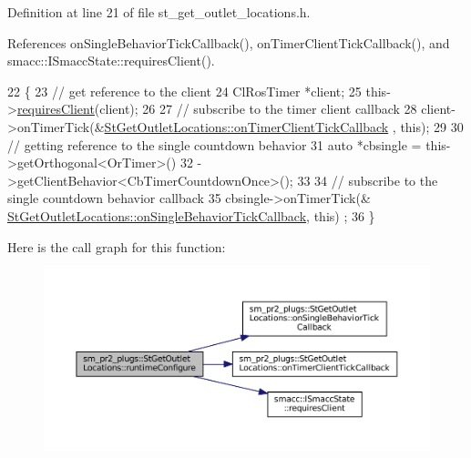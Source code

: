 Definition at line 21 of file st\+\_\+get\+\_\+outlet\+\_\+locations.\+h.



References on\+Single\+Behavior\+Tick\+Callback(), on\+Timer\+Client\+Tick\+Callback(), and smacc\+::\+I\+Smacc\+State\+::requires\+Client().


\begin{DoxyCode}
22     \{
23         \textcolor{comment}{// get reference to the client}
24         ClRosTimer *client;
25         this->\hyperlink{classsmacc_1_1ISmaccState_a7f95c9f0a6ea2d6f18d1aec0519de4ac}{requiresClient}(client);
26 
27         \textcolor{comment}{// subscribe to the timer client callback}
28         client->onTimerTick(&\hyperlink{structsm__pr2__plugs_1_1StGetOutletLocations_a46a5f83dd8f5465356ab0652f34c9c52}{StGetOutletLocations::onTimerClientTickCallback}
      , \textcolor{keyword}{this});
29 
30         \textcolor{comment}{// getting reference to the single countdown behavior}
31         \textcolor{keyword}{auto} *cbsingle = this->getOrthogonal<OrTimer>()
32                              ->getClientBehavior<CbTimerCountdownOnce>();
33 
34         \textcolor{comment}{// subscribe to the single countdown behavior callback}
35         cbsingle->onTimerTick(&
      \hyperlink{structsm__pr2__plugs_1_1StGetOutletLocations_acdde8773e35f30d4c5084903e2fe0259}{StGetOutletLocations::onSingleBehaviorTickCallback}, \textcolor{keyword}{this})
      ;
36     \}
\end{DoxyCode}
Here is the call graph for this function\+:
\nopagebreak
\begin{figure}[H]
\begin{center}
\leavevmode
\includegraphics[width=350pt]{structsm__pr2__plugs_1_1StGetOutletLocations_ad5b299ff3f4253429690b22f3a81d9cf_cgraph}
\end{center}
\end{figure}
\mbox{\label{structsm__pr2__plugs_1_1StGetOutletLocations_ae798350a0b8946793b6bf37e678d1910}} 
